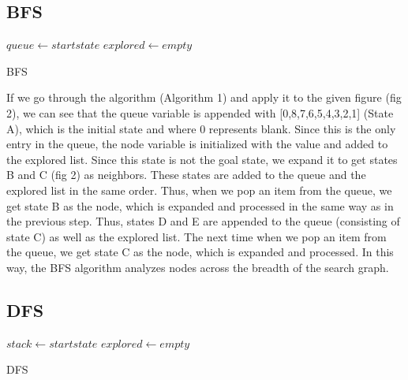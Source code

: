 \documentclass{svproc}
\begin{document}
\subsection{BFS}
\setlength{\intextsep}{5pt}
\begin{algorithm}
	\SetAlgoLined
	 $queue \gets start state$\;
	 $explored \gets empty$\;
	\caption{BFS}
\end{algorithm}

\noindent If we go through the algorithm (Algorithm 1) and apply it to the given figure (fig 2), we can see that the queue variable is appended with [0,8,7,6,5,4,3,2,1] (State A), which is the initial state and where 0 represents blank. Since this is the only entry in the queue, the node variable is initialized with the value and added to the explored list. Since this state is not the goal state, we expand it to get states B and C (fig 2) as neighbors. These states are added to the queue and the explored list in the same order. Thus, when we pop an item from the queue, we get state B as the node, which is expanded and processed in the same way as in the previous step. Thus, states D and E are appended to the queue (consisting of state C) as well as the explored list. The next time when we pop an item from the queue, we get state C as the node, which is expanded and processed. In this way, the BFS algorithm analyzes nodes across the breadth of the search graph.

\subsection{DFS}
\setlength{\intextsep}{5pt}
\begin{algorithm}
	\SetAlgoLined
	$stack \gets start state$\;
	$explored \gets empty$\;
	\caption{DFS}
\end{algorithm}
\end{document}
